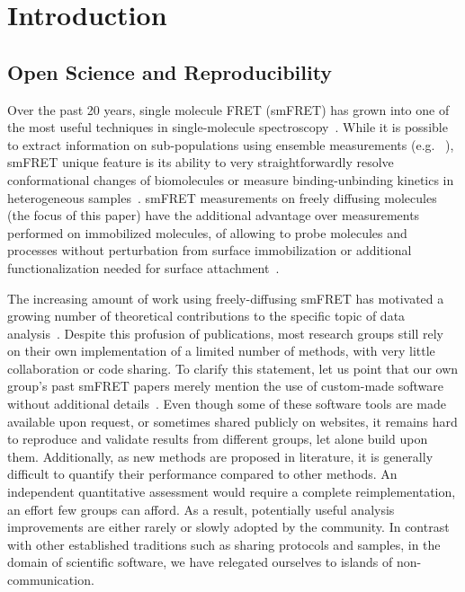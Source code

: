 \section{Introduction}

\subsection{Open Science and Reproducibility}

Over the past 20 years, single molecule FRET (smFRET) has grown into one of the most
useful techniques in single-molecule spectroscopy~\cite{Weiss_1999,Hohlbein_2014}.
While it is possible to extract information on sub-populations using ensemble measurements 
(e.g. ~\cite{Lerner_2014,Rahamim_2015}),
smFRET unique feature is its ability to very straightforwardly resolve conformational
changes of biomolecules or measure binding-unbinding kinetics in heterogeneous 
samples~\cite{Selvin_2000,Roy_2008}.
smFRET measurements on freely diffusing molecules (the focus of this paper) 
have the additional advantage over measurements performed on immobilized molecules, 
of allowing to probe molecules and processes without perturbation from surface
immobilization or additional functionalization needed for surface 
attachment~\cite{Eggeling_1998,Dahan_1999}.

The increasing amount of work using freely-diffusing smFRET has motivated 
a growing number of theoretical contributions to the specific topic of data 
analysis~\cite{Fries_1998,Eggeling_2001,Zhang_2005,Gopich_2005,Lee_2005,Nir_2006,Antonik2006,Gopich_2007,Gopich_2008,Camley_2009,Santoso_2010,Torella_2011,Tomov_2012}. 
Despite this profusion of publications, most research groups still rely on 
their own implementation of a limited number of methods, with very little 
collaboration or code sharing. 
To clarify this statement, let us point that our own group's past smFRET papers 
merely mention the use of custom-made software without additional details~\cite{Lee_2005,Nir_2006}. 
Even though some of these software tools are made available upon request, 
or sometimes shared publicly on websites, 
it remains hard to reproduce and validate results from different groups, 
let alone build upon them.
Additionally, as new methods are proposed in literature,
it is generally difficult to quantify their performance compared to other methods.
An independent quantitative assessment
would require a complete reimplementation, an effort few groups can afford.
As a result, potentially useful analysis improvements
are either rarely or slowly adopted by the community.
In contrast with other established traditions such as
sharing protocols and samples, in the domain of scientific software,
we have relegated ourselves to islands of non-communication.

